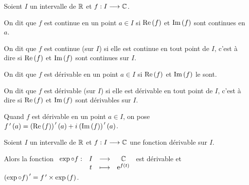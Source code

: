 \begin{defi}
Soient \(I\) un intervalle de \(\mathbb{R}\) et \(f:I\longrightarrow\mathbb{C}\).

On dit que \(f\) est continue en un point \(a\in I\) si \(\operatorname{Re}\left(f\right)\) et \(\operatorname{Im}\left(f\right)\) sont continues en \(a\).

On dit que \(f\) est continue (sur \(I\)) si elle est continue en tout point de \(I\), c'est à dire si \(\operatorname{Re}\left(f\right)\) et \(\operatorname{Im}\left(f\right)\) sont continues sur \(I\).

On dit que \(f\) est dérivable en un point \(a\in I\) si \(\operatorname{Re}\left(f\right)\) et \(\operatorname{Im}\left(f\right)\) le sont.

On dit que \(f\) est dérivable (sur \(I\)) si elle est dérivable en tout point de \(I\), c'est à dire si \(\operatorname{Re}\left(f\right)\) et \(\operatorname{Im}\left(f\right)\) sont dérivables sur \(I\).

Quand \(f\) est dérivable en un point \(a\in I\), on pose \(f^{\,\prime}\left(a\right)=\left(\operatorname{Re}\left(f\right)\right)^{\,\prime}\left(a\right)+i\mkern1mu\left(\operatorname{Im}\left(f\right)\right)^{\,\prime}\left(a\right)\).
\end{defi}

\begin{theo}
Soient \(I\) un intervalle de \(\mathbb{R}\) et \(f:I\longrightarrow\mathbb{C}\) une fonction dérivable sur \(I\).

Alors la fonction \(\begin{array}[t]{cccc}\exp\circ f : & I & \longrightarrow & \mathbb{C} \\ & t & \longmapsto & \mathrm{e}^{f\left(t\right)}\end{array}\) est dérivable et \(\left(\exp\circ f\right)^{\,\prime}=f^{\,\prime}\times\exp\left(f\right)\).
\end{theo}

